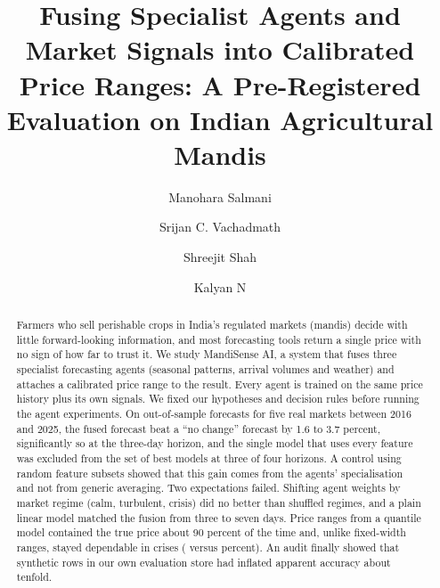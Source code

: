 \documentclass[runningheads]{llncs}
\begin{document}
\title{Fusing Specialist Agents and Market Signals into Calibrated Price Ranges: A Pre-Registered Evaluation on Indian Agricultural Mandis}

\author{Manohara Salmani \and Srijan C. Vachadmath \and Shreejit Shah \and Kalyan N}

\maketitle

\begin{abstract}
Farmers who sell perishable crops in India's regulated markets (mandis) decide with little forward-looking information, and most forecasting tools return a single price with no sign of how far to trust it. We study MandiSense AI, a system that fuses three specialist forecasting agents (seasonal patterns, arrival volumes and weather) and attaches a calibrated price range to the result. Every agent is trained on the same price history plus its own signals. We fixed our hypotheses and decision rules before running the agent experiments. On \NTotal{} out-of-sample forecasts for five real markets between 2016 and 2025, the fused forecast beat a ``no change'' forecast by 1.6 to 3.7 percent, significantly so at the three-day horizon, and the single model that uses every feature was excluded from the set of best models at three of four horizons. A control using random feature subsets showed that this gain comes from the agents' specialisation and not from generic averaging. Two expectations failed. Shifting agent weights by market regime (calm, turbulent, crisis) did no better than shuffled regimes, and a plain linear model matched the fusion from three to seven days. Price ranges from a quantile model contained the true price about 90 percent of the time and, unlike fixed-width ranges, stayed dependable in crises (\CrisisXgb{} versus \CrisisPooled{} percent). An audit finally showed that synthetic rows in our own evaluation store had inflated apparent accuracy about tenfold.
\end{abstract}
\end{document}
